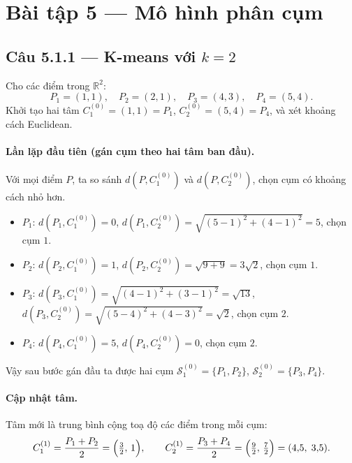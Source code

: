 \section*{Bài tập 5 --- Mô hình phân cụm}

\subsection*{Câu 5.1.1 --- K-means với $k=2$}

Cho các điểm trong $\mathbb{R}^2$:
\[
P_1=(1,1),\quad P_2=(2,1),\quad P_3=(4,3),\quad P_4=(5,4).
\]
Khởi tạo hai tâm $C_1^{(0)}=(1,1)=P_1$, $C_2^{(0)}=(5,4)=P_4$, và xét khoảng cách Euclidean.

\paragraph{Lần lặp đầu tiên (gán cụm theo hai tâm ban đầu).}
Với mọi điểm $P$, ta so sánh $d(P,C_1^{(0)})$ và $d(P,C_2^{(0)})$, chọn cụm có khoảng cách nhỏ hơn.

\begin{itemize}
  \item $P_1$: $d(P_1,C_1^{(0)})=0$, $d(P_1,C_2^{(0)})=\sqrt{(5-1)^2+(4-1)^2}=5$, chọn cụm $1$.
  \item $P_2$: $d(P_2,C_1^{(0)})=1$, $d(P_2,C_2^{(0)})=\sqrt{9+9}=3\sqrt2$, chọn cụm $1$.
  \item $P_3$: $d(P_3,C_1^{(0)})=\sqrt{(4-1)^2+(3-1)^2}=\sqrt{13}$,\\
        $d(P_3,C_2^{(0)})=\sqrt{(5-4)^2+(4-3)^2}=\sqrt2$, chọn cụm $2$.
  \item $P_4$: $d(P_4,C_1^{(0)})=5$, $d(P_4,C_2^{(0)})=0$, chọn cụm $2$.
\end{itemize}

Vậy sau bước gán đầu ta được hai cụm $\mathcal{S}_1^{(0)}=\{P_1,P_2\}$, $\mathcal{S}_2^{(0)}=\{P_3,P_4\}$.

\paragraph{Cập nhật tâm.}
Tâm mới là trung bình cộng toạ độ các điểm trong mỗi cụm:
\[
C_1^{(1)}=\frac{P_1+P_2}{2}=\Bigl(\tfrac32,\,1\Bigr),\qquad
C_2^{(1)}=\frac{P_3+P_4}{2}=\Bigl(\tfrac92,\,\tfrac72\Bigr)=(4{,}5,\;3{,}5).
\]

